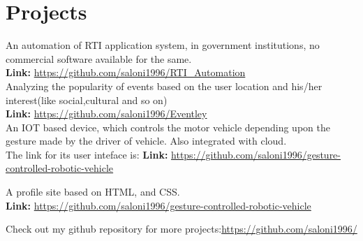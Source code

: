 \documentclass[]{hieudo-build}
\begin{document}
\begin{minipage}[t]{0.69\textwidth} 

\section{Projects}

\descript{}
An automation of RTI application system, in government institutions, no commercial software available for the same. \\
\textbf{Link:} \url{https://github.com/saloni1996/RTI_Automation}
\sectionsep\\

\descript{}
Analyzing the popularity of events based on the user location and his/her interest(like social,cultural and so on)\\
\textbf{Link:} \url{https://github.com/saloni1996/Eventley}
\sectionsep\\

\descript{}
An IOT based device, which controls the motor vehicle depending upon the gesture made by the driver of vehicle. Also integrated with cloud.\\
The link for its user inteface is: \textbf{Link:} \url{https://github.com/saloni1996/gesture-controlled-robotic-vehicle}
\sectionsep 

\descript{}
A profile site based on HTML, and CSS. \\
 \textbf{Link:} \url{https://github.com/saloni1996/gesture-controlled-robotic-vehicle}
\sectionsep

\descript{}
Check out my github repository for more projects:\url{https://github.com/saloni1996/}
\sectionsep

\end{minipage} 
\end{document}

